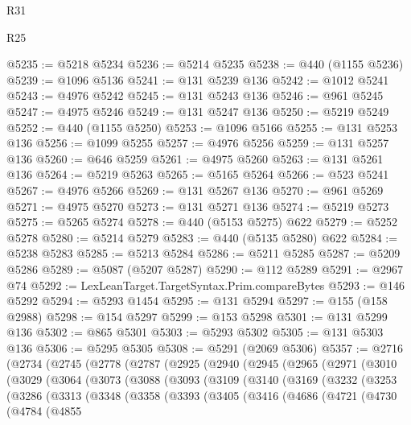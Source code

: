 \begin{lexlean}{R31}
\begin{lexlean}{R25}
\begin{coremodule}
{{{{{{{{{{{{{{{{{{{{{{{{{{{{{{{{{{{{{{{{{{{{{{{{{{{{{{{{{{{{{{{{{{{{{{{{{{{{{{{{{{{{{{{{{{{{{{{{{{{{{{{{{{{{{{{{{{{{{{{{{{{{{{{{{{{{{{{{{{{{{{{{{{{{{{{{{{{{{{{{{{{{{{{{{{{{{{{{{{{{{{{{{{{{{{{{{{{{{{{@5235 := @5218 @5234
@5236 := @5214 @5235
@5238 := @440 (@1155 @5236)
@5239 := @1096 @5136
@5241 := @131 @5239 @136
@5242 := @1012 @5241
@5243 := @4976 @5242
@5245 := @131 @5243 @136
@5246 := @961 @5245
@5247 := @4975 @5246
@5249 := @131 @5247 @136
@5250 := @5219 @5249
@5252 := @440 (@1155 @5250)
@5253 := @1096 @5166
@5255 := @131 @5253 @136
@5256 := @1099 @5255
@5257 := @4976 @5256
@5259 := @131 @5257 @136
@5260 := @646 @5259
@5261 := @4975 @5260
@5263 := @131 @5261 @136
@5264 := @5219 @5263
@5265 := @5165 @5264
@5266 := @523 @5241
@5267 := @4976 @5266
@5269 := @131 @5267 @136
@5270 := @961 @5269
@5271 := @4975 @5270
@5273 := @131 @5271 @136
@5274 := @5219 @5273
@5275 := @5265 @5274
@5278 := @440 (@5153 @5275) @622
@5279 := @5252 @5278
@5280 := @5214 @5279
@5283 := @440 (@5135 @5280) @622
@5284 := @5238 @5283
@5285 := @5213 @5284
@5286 := @5211 @5285
@5287 := @5209 @5286
@5289 := @5087 (@5207 @5287)
@5290 := @112 @5289
@5291 := @2967 @74
@5292 := LexLeanTarget.TargetSyntax.Prim.compareBytes
@5293 := @146 @5292
@5294 := @5293 @1454
@5295 := @131 @5294
@5297 := @155 (@158 @2988)
@5298 := @154 @5297
@5299 := @153 @5298
@5301 := @131 @5299 @136
@5302 := @865 @5301
@5303 := @5293 @5302
@5305 := @131 @5303 @136
@5306 := @5295 @5305
@5308 := @5291 (@2069 @5306)
@5357 := @2716
    (@2734
      (@2745
        (@2778
          (@2787
            (@2925
              (@2940
                (@2945
                  (@2965
                    (@2971
                      (@3010
                        (@3029
                          (@3064
                            (@3073
                              (@3088
                                (@3093
                                  (@3109
                                    (@3140
                                      (@3169
                                        (@3232
                                          (@3253
                                            (@3286
                                              (@3313
                                                (@3348
                                                  (@3358
                                                    (@3393
                                                      (@3405
                                                        (@3416
                                                          (@4686
                                                            (@4721
                                                              (@4730
                                                                (@4784
                                                                  (@4855
}}}}}}}}}}}}}}}}}}}}}}}}}}}}}}}}}}}}}}}}}}}}}}}}}}}}}}}}}}}}}}}}}}}}}}}}}}}}}}}}}}}}}}}}}}}}}}}}}}}}}}}}}}}}}}}}}}}}}}}}}}}}}}}}}}}}}}}}}}}}}}}}}}}}}}}}}}}}}}}}}}}}}}}}}}}}}}}}}}}}}}}}}}}}}}}}}}}}}}}
\end{coremodule}
\end{lexlean}
\end{lexlean}
